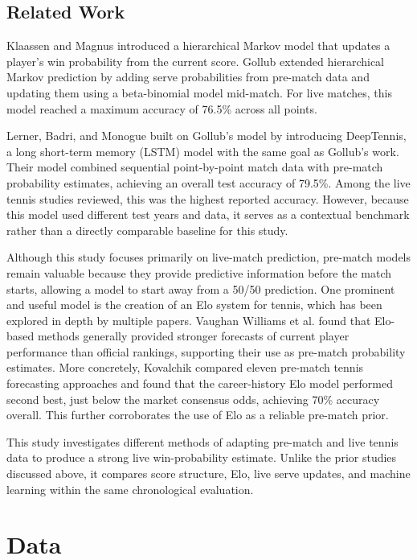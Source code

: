 \documentclass[10pt,twocolumn]{article}
\begin{document}
\subsection{Related Work}

Klaassen and Magnus introduced a hierarchical Markov model that updates a player's win probability from the current score.\cite{klaassen2003} Gollub extended hierarchical Markov prediction by adding serve probabilities from pre-match data and updating them using a beta-binomial model mid-match. For live matches, this model reached a maximum accuracy of 76.5\% across all points.\cite{gollub2017}

Lerner, Badri, and Monogue built on Gollub's model by introducing DeepTennis, a long short-term memory (LSTM) model with the same goal as Gollub's work. Their model combined sequential point-by-point match data with pre-match probability estimates, achieving an overall test accuracy of 79.5\%.\cite{lerner2019} Among the live tennis studies reviewed, this was the highest reported accuracy. However, because this model used different test years and data, it serves as a contextual benchmark rather than a directly comparable baseline for this study.

Although this study focuses primarily on live-match prediction, pre-match models remain valuable because they provide predictive information before the match starts, allowing a model to start away from a 50/50 prediction. One prominent and useful model is the creation of an Elo system for tennis, which has been explored in depth by multiple papers. Vaughan Williams et al. found that Elo-based methods generally provided stronger forecasts of current player performance than official rankings, supporting their use as pre-match probability estimates.\cite{vaughan2021} More concretely, Kovalchik compared eleven pre-match tennis forecasting approaches and found that the career-history Elo model performed second best, just below the market consensus odds, achieving 70\% accuracy overall.\cite{kovalchik2016} This further corroborates the use of Elo as a reliable pre-match prior.

This study investigates different methods of adapting pre-match and live tennis data to produce a strong live win-probability estimate. Unlike the prior studies discussed above, it compares score structure, Elo, live serve updates, and machine learning within the same chronological evaluation.

\section{Data}
\end{document}
